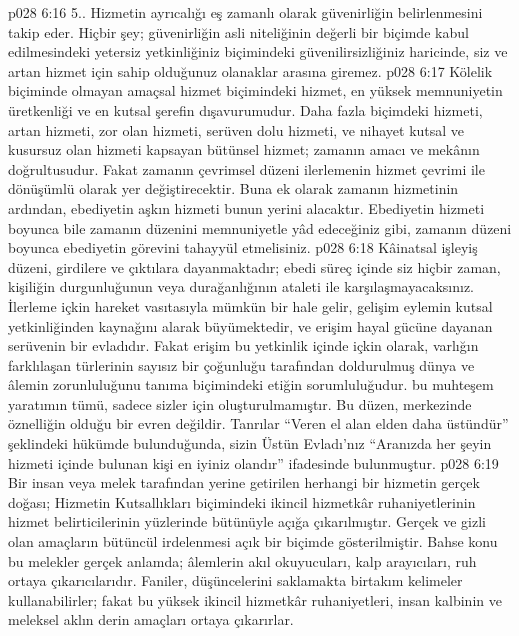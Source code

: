 \vs p028 6:16 5.. Hizmetin ayrıcalığı eş zamanlı olarak güvenirliğin belirlenmesini takip eder. Hiçbir şey; güvenirliğin asli niteliğinin değerli bir biçimde kabul edilmesindeki yetersiz yetkinliğiniz biçimindeki güvenilirsizliğiniz haricinde, siz ve artan hizmet için sahip olduğunuz olanaklar arasına giremez.
\vs p028 6:17 Kölelik biçiminde olmayan amaçsal hizmet biçimindeki hizmet, en yüksek memnuniyetin üretkenliği ve en kutsal şerefin dışavurumudur. Daha fazla biçimdeki hizmeti, artan hizmeti, zor olan hizmeti, serüven dolu hizmeti, ve nihayet kutsal ve kusursuz olan hizmeti kapsayan bütünsel hizmet; zamanın amacı ve mekânın doğrultusudur. Fakat zamanın çevrimsel düzeni ilerlemenin hizmet çevrimi ile dönüşümlü olarak yer değiştirecektir. Buna ek olarak zamanın hizmetinin ardından, ebediyetin aşkın hizmeti bunun yerini alacaktır. Ebediyetin hizmeti boyunca bile zamanın düzenini memnuniyetle yâd edeceğiniz gibi, zamanın düzeni boyunca ebediyetin görevini tahayyül etmelisiniz.
\vs p028 6:18 Kâinatsal işleyiş düzeni, girdilere ve çıktılara dayanmaktadır; ebedi süreç içinde siz hiçbir zaman, kişiliğin durgunluğunun veya durağanlığının ataleti ile karşılaşmayacaksınız. İlerleme içkin hareket vasıtasıyla mümkün bir hale gelir, gelişim eylemin kutsal yetkinliğinden kaynağını alarak büyümektedir, ve erişim hayal gücüne dayanan serüvenin bir evladıdır. Fakat erişim bu yetkinlik içinde içkin olarak, varlığın farklılaşan türlerinin sayısız bir çoğunluğu tarafından doldurulmuş dünya ve âlemin zorunluluğunu tanıma biçimindeki etiğin sorumluluğudur.  bu muhteşem yaratımın tümü, sadece sizler için oluşturulmamıştır. Bu düzen, merkezinde öznelliğin olduğu bir evren değildir. Tanrılar “Veren el alan elden daha üstündür” şeklindeki hükümde bulunduğunda, sizin Üstün Evladı’nız “Aranızda her şeyin hizmeti içinde bulunan kişi en iyiniz olandır” ifadesinde bulunmuştur.
\vs p028 6:19 Bir insan veya melek tarafından yerine getirilen herhangi bir hizmetin gerçek doğası; Hizmetin Kutsallıkları biçimindeki ikincil hizmetkâr ruhaniyetlerinin hizmet belirticilerinin yüzlerinde bütünüyle açığa çıkarılmıştır. Gerçek ve gizli olan amaçların bütüncül irdelenmesi açık bir biçimde gösterilmiştir. Bahse konu bu melekler gerçek anlamda; âlemlerin akıl okuyucuları, kalp arayıcıları, ruh ortaya çıkarıcılarıdır. Faniler, düşüncelerini saklamakta birtakım kelimeler kullanabilirler; fakat bu yüksek ikincil hizmetkâr ruhaniyetleri, insan kalbinin ve meleksel aklın derin amaçları ortaya çıkarırlar.
